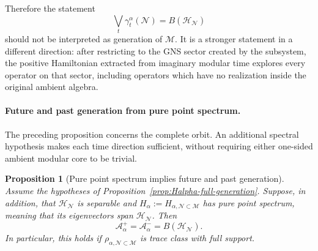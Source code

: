 \documentclass[a4paper,11pt]{article}
\newtheorem{proposition}[theorem]{Proposition}
\theoremstyle{definition}
\newcommand{\mN}{\mathcal{N}}
\newcommand{\mH}{\mathcal{H}}
\newcommand{\mM}{\mathcal{M}}
\begin{document}
Therefore the statement
\begin{equation}
    \bigvee_t\gamma_t^\alpha(\mN)
    =
    B(\mH_{\mN})
\end{equation}
should not be interpreted as generation of $\mM$. It is a stronger
statement in a different direction: after restricting to the GNS sector
created by the subsystem, the positive Hamiltonian extracted from imaginary
modular time explores every operator on that sector, including operators
which have no realization inside the original ambient algebra.

\paragraph{Future and past generation from pure point spectrum.}
The preceding proposition concerns the complete orbit. An additional
spectral hypothesis makes each time direction sufficient, without
requiring either one-sided ambient modular core to be trivial.

\begin{proposition}[Pure point spectrum implies future and past generation]
\label{prop:Halpha-pure-point-one-sided-generation}
Assume the hypotheses of Proposition~\ref{prop:Halpha-full-generation}.
Suppose, in addition, that $\mH_{\mN}$ is separable and
$H_\alpha:=H_{\alpha,\mN\subset\mM}$ has pure point spectrum, meaning
that its eigenvectors span $\mH_{\mN}$. Then
\begin{equation}
    \boxed{
    \mathcal A_\alpha^+
    =\mathcal A_\alpha^-
    =B(\mH_{\mN}).
    }
    \label{eq:Halpha-pure-point-one-sided-generation}
\end{equation}
In particular, this holds if
$\rho_{\alpha,\mN\subset\mM}$ is trace class with full support.
\end{proposition}
\end{document}
